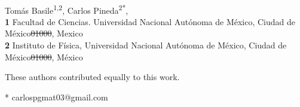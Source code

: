 \documentclass[10pt,letterpaper]{article} %
\providecommand{\DIFdeltex}[1]{{\protect\color{red}\sout{#1}}}                      %
\providecommand{\DIFdelbegin}{} %
\providecommand{\DIFdelend}{} %
\providecommand{\DIFdel}[1]{\texorpdfstring{\DIFdeltex{#1}}{}} %
\newcommand{\DIFscaledelfig}{0.5}
\newlength{\DIFdelgraphicswidth} %
\newlength{\DIFdelgraphicsheight} %
\newcommand{\DIFdelincludegraphics}[2][]{%
\sbox{\DIFdelgraphicsbox}{\DIFOincludegraphics[#1]{#2}}%
\settoboxwidth{\DIFdelgraphicswidth}{\DIFdelgraphicsbox} %
\settoboxtotalheight{\DIFdelgraphicsheight}{\DIFdelgraphicsbox} %
\scalebox{\DIFscaledelfig}{%
\parbox[b]{\DIFdelgraphicswidth}{\usebox{\DIFdelgraphicsbox}\\[-\baselineskip] \rule{\DIFdelgraphicswidth}{0em}}\llap{\resizebox{\DIFdelgraphicswidth}{\DIFdelgraphicsheight}{%
\setlength{\unitlength}{\DIFdelgraphicswidth}%
\begin{picture}(1,1)%
\thicklines\linethickness{2pt} %
{\color[rgb]{1,0,0}\put(0,0){\framebox(1,1){}}}%
{\color[rgb]{1,0,0}\put(0,0){\line( 1,1){1}}}%
{\color[rgb]{1,0,0}\put(0,1){\line(1,-1){1}}}%
\end{picture}%
}\hspace*{3pt}}} %
} %
\DeclareRobustCommand{\DIFdelbegin}{\DIFOdelbegin \let\includegraphics\DIFdelincludegraphics} %
\DeclareRobustCommand{\DIFdelend}{\DIFOaddend \let\includegraphics\DIFOincludegraphics} %
\begin{document}
\vspace*{0.2in}

\begin{flushleft}
{\Large
\textbf{} %
}
\newline
\\
Tomás Basile\textsuperscript{1,2\Yinyang},
Carlos Pineda\textsuperscript{2*\Yinyang},
\\
\bigskip
\textbf{1} Facultad de Ciencias. Universidad Nacional Autónoma de México, Ciudad de México\DIFdelbegin \DIFdel{01000}\DIFdelend , Mexico
\\
\textbf{2} Instituto de Física, Universidad Nacional Autónoma de México, Ciudad de México\DIFdelbegin \DIFdel{01000}\DIFdelend , México
\\
\bigskip

% 
%
\Yinyang These authors contributed equally to this work.





* carlospgmat03@gmail.com

\end{flushleft}
\end{document}
